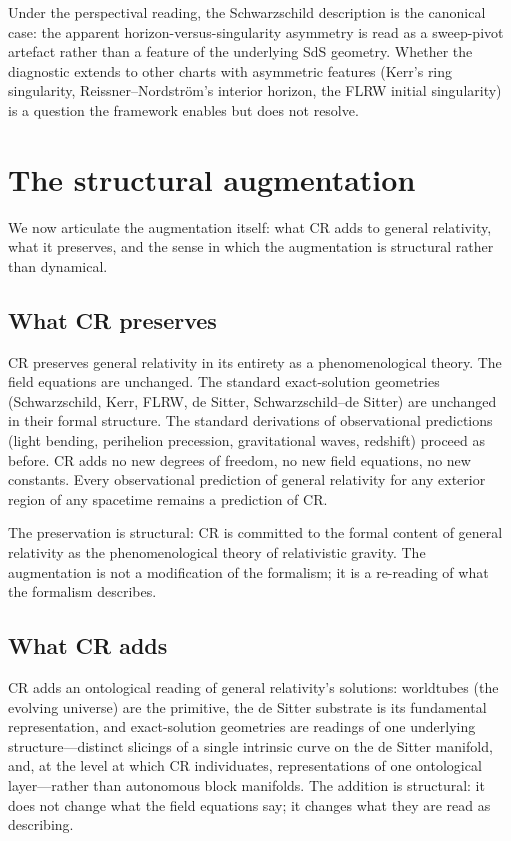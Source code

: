 \documentclass[11pt,a4paper]{article}
\theoremstyle{definition}
\begin{document}
Under the perspectival reading, the Schwarzschild description is the canonical case: the apparent horizon-versus-singularity asymmetry is read as a sweep-pivot artefact rather than a feature of the underlying SdS geometry. Whether the diagnostic extends to other charts with asymmetric features (Kerr's ring singularity, Reissner--Nordstr\"om's interior horizon, the FLRW initial singularity) is a question the framework enables but does not resolve.

\section{The structural augmentation}\label{sec:augmentation}

We now articulate the augmentation itself: what CR adds to general relativity, what it preserves, and the sense in which the augmentation is structural rather than dynamical.

\subsection{What CR preserves}\label{sec:preserves}

CR preserves general relativity in its entirety as a phenomenological theory. The field equations are unchanged. The standard exact-solution geometries (Schwarzschild, Kerr, FLRW, de Sitter, Schwarzschild--de Sitter) are unchanged in their formal structure. The standard derivations of observational predictions (light bending, perihelion precession, gravitational waves, redshift) proceed as before. CR adds no new degrees of freedom, no new field equations, no new constants. Every observational prediction of general relativity for any exterior region of any spacetime remains a prediction of CR.

The preservation is structural: CR is committed to the formal content of general relativity as the phenomenological theory of relativistic gravity. The augmentation is not a modification of the formalism; it is a re-reading of what the formalism describes.

\subsection{What CR adds}\label{sec:adds}

CR adds an ontological reading of general relativity's solutions: worldtubes (the evolving universe) are the primitive, the de Sitter substrate is its fundamental representation, and exact-solution geometries are readings of one underlying structure---distinct slicings of a single intrinsic curve on the de Sitter manifold, and, at the level at which CR individuates, representations of one ontological layer---rather than autonomous block manifolds. The addition is structural: it does not change what the field equations say; it changes what they are read as describing.
\end{document}
